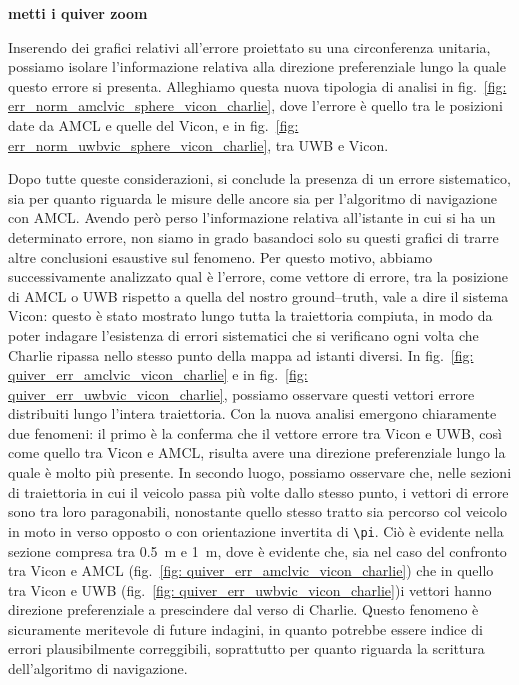 \textbf{metti i quiver zoom}

\vspace{0.5cm}
Inserendo dei grafici relativi all'errore proiettato su una circonferenza unitaria, possiamo isolare l'informazione relativa alla direzione 
preferenziale lungo la quale questo errore si presenta. Alleghiamo questa nuova tipologia di analisi in fig.~\ref{fig: err_norm_amclvic_sphere_vicon_charlie}, dove l'errore è quello tra le posizioni date da AMCL e quelle del Vicon, e in fig.~\ref{fig: err_norm_uwbvic_sphere_vicon_charlie}, tra UWB e Vicon. 

\vspace{0.5cm}
Dopo tutte queste considerazioni, si conclude la presenza di un errore sistematico, sia per quanto riguarda le misure delle ancore sia per l'algoritmo di navigazione con AMCL. Avendo però perso l'informazione relativa all'istante in cui si ha un determinato errore, non siamo in grado basandoci solo su questi grafici di trarre altre conclusioni esaustive sul fenomeno. Per questo motivo, abbiamo successivamente analizzato qual è l'errore, come vettore di errore, tra la posizione di AMCL o UWB rispetto a quella del nostro ground--truth, vale a dire il sistema Vicon: questo è stato mostrato lungo tutta la traiettoria compiuta, in modo da poter indagare l'esistenza di errori sistematici che si verificano ogni volta che Charlie ripassa nello stesso punto della mappa ad istanti diversi. 
In fig.~\ref{fig: quiver_err_amclvic_vicon_charlie} e in fig.~\ref{fig: quiver_err_uwbvic_vicon_charlie}, possiamo osservare questi vettori errore distribuiti lungo l'intera traiettoria. 
Con la nuova analisi emergono chiaramente due fenomeni: il primo è la conferma che il vettore errore tra Vicon e UWB, così come quello tra Vicon e AMCL, risulta avere una direzione preferenziale lungo la quale è molto più presente. In secondo luogo, possiamo osservare che, nelle sezioni di traiettoria in cui il veicolo passa più volte dallo stesso punto, i vettori di errore sono tra loro paragonabili, nonostante quello stesso tratto sia percorso col veicolo in moto in verso opposto o con orientazione invertita di \verb|\pi|. Ciò è evidente nella sezione compresa tra \SI{0.5}{\metre} e \SI{1}{\metre}, dove è evidente che, sia nel caso del confronto tra Vicon e AMCL (fig.~\ref{fig: quiver_err_amclvic_vicon_charlie}) che in quello tra Vicon e UWB (fig.~\ref{fig: quiver_err_uwbvic_vicon_charlie})i vettori hanno direzione preferenziale a prescindere dal verso di Charlie.
Questo fenomeno è sicuramente meritevole di future indagini, in quanto potrebbe essere indice di errori plausibilmente correggibili, soprattutto per quanto riguarda la scrittura dell'algoritmo di navigazione.


